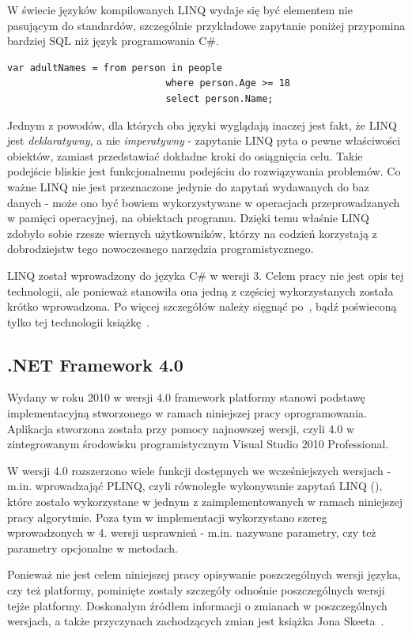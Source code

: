 W świecie języków kompilowanych LINQ wydaje się być elementem nie pasującym do standardów, szczególnie przykładowe zapytanie poniżej przypomina bardziej SQL niż język programowania C\#. 

\begin{lstlisting}
var adultNames = from person in people
							where person.Age >= 18
							select person.Name;
\end{lstlisting}

Jednym z powodów, dla których oba języki wyglądają inaczej jest fakt, że LINQ jest \emph{deklaratywny}, a nie \emph{imperatywny} - zapytanie LINQ pyta o pewne właściwości obiektów, zamiast przedstawiać dokładne kroki do osiągnięcia celu. Takie podejście bliskie jest funkcjonalnemu podejściu do rozwiązywania problemów. Co ważne LINQ nie jest przeznaczone jedynie do zapytań wydawanych do baz danych - może ono być bowiem wykorzystywane w operacjach przeprowadzanych w pamięci operacyjnej, na obiektach programu. Dzięki temu właśnie LINQ zdobyło sobie rzesze wiernych użytkowników, którzy na codzień korzystają z dobrodziejstw tego nowoczesnego narzędzia programistycznego.

LINQ został wprowadzony do języka C\# w wersji 3. Celem pracy nie jest opis tej technologii, ale ponieważ stanowiła ona jedną z częściej wykorzystanych została krótko wprowadzona. Po więcej szczegółów należy sięgnąć po~\cite{cSharp:inDepthS}, bądź poświeconą tylko tej technologii książkę~\cite{cSharp:linq}.

\subsection{.NET Framework 4.0}
Wydany w roku 2010 w wersji 4.0 framework platformy stanowi podstawę implementacyjną stworzonego w ramach niniejszej pracy oprogramowania. Aplikacja stworzona została przy pomocy najnowszej wersji, czyli 4.0 w zintegrowanym środowisku programistycznym Visual Studio 2010 Professional. 

W wersji 4.0 rozszerzono wiele funkcji dostępnych we wcześniejszych wersjach - m.in. wprowadzająć PLINQ, czyli równoległe wykonywanie zapytań LINQ (), które zostało wykorzystane w jednym z zaimplementowanych w ramach niniejszej pracy algorytmie. Poza tym w implementacji wykorzystano szereg wprowadzonych w 4. wersji usprawnień - m.in. nazywane parametry, czy też parametry opcjonalne w metodach. 

Ponieważ nie jest celem niniejszej pracy opisywanie poszczególnych wersji języka, czy też platformy, pominięte zostały szczegóły odnośnie poszczególnych wersji tejże platformy. Doskonałym źródłem informacji o zmianach w poszczególnych wersjach, a także przyczynach zachodzących zmian jest książka Jona Skeeta~\cite{cSharp:inDepthS}.

